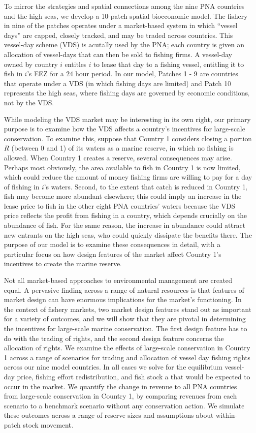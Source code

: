 \documentclass[12pt]{article}
\begin{document}
To mirror the strategies and spatial connections among the nine PNA countries and the high seas, we develop a 10-patch spatial bioeconomic model. The fishery in nine of the patches operates under a market-based system in which ``vessel days'' are capped, closely tracked, and may be traded across countries.  This vessel-day scheme (VDS) is acutally used by the PNA; each country is given an allocation of vessel-days that can then be sold to fishing firms. A vessel-day owned by country $i$ entitles $i$ to lease that day to a fishing vessel, entitling it to fish in $i$'s EEZ for a 24 hour period. In our model, Patches 1 - 9 are countries that operate under a VDS (in which fishing days are limited) and Patch 10 represents the high seas, where fishing days are governed by economic conditions, not by the VDS.

While modeling the VDS market may be interesting in its own right, our primary purpose is to examine how the VDS affects a country's incentives for large-scale conservation. To examine this, suppose that Country 1 considers closing a portion $R$ (between 0 and 1) of its waters as a marine reserve, in which no fishing is allowed. When Country 1 creates a reserve, several consequences may arise.  Perhaps most obviously, the area available to fish in Country 1 is now limited, which could reduce the amount of money fishing firms are willing to pay for a day of fishing in $i$'s waters.  Second, to the extent that catch is reduced in Country 1, fish may become more abundant elsewhere; this could imply an increase in the lease price to fish in the other eight PNA countries' waters because the VDS price reflects the profit from fishing in a country, which depends crucially on the abundance of fish. For the same reason, the increase in abundance could attract new entrants on the high seas, who could quickly dissipate the benefits there. The purpose of our model is to examine these consequences in detail, with a particular focus on how design features of the market affect Country 1's incentives to create the marine reserve.

Not all market-based approaches to environmental management are created equal. A pervasive finding across a range of natural resources is that features of market design can have enormous implications for the market's functioning. In the context of fishery markets, two market design features stand out as important for a variety of outcomes, and we will show that they are pivotal in determining the incentives for large-scale marine conservation. The first design feature has to do with the trading of rights, and the second design feature concerns the allocation of rights. We examine the effects of large-scale conservation in Country 1 across a range of scenarios for trading and allocation of vessel day fishing rights across our nine model countries. In all cases we solve for the equilibrium vessel-day price, fishing effort redistribution, and fish stock a that would be expected to occur in the market. We quantify the change in revenue to all PNA countries from large-scale conservation in Country 1, by comparing revenues from each scenario to a benchmark scenario without any conservation action. We simulate these outcomes across a range of reserve sizes and assumptions about within-patch stock movement.
\end{document}
